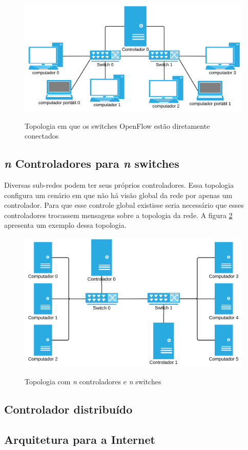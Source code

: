 \begin{figure}[h!]
    \centering
    \includegraphics[scale=0.8]{img/controller-n-linked-switches}
    \label{fig:controller-n-linked-switches}
    \caption{Topologia em que os switches OpenFlow 
    estão diretamente conectados}
\end{figure}


\subsection{\emph{n} Controladores para \emph{n} switches}

Diversas sub-redes podem ter seus próprios controladores.
Essa topologia configura um cenário em que não há visão global da rede 
por apenas um controlador. 
Para que esse controle global existisse seria necessário que esses 
controladores trocassem mensagens sobre a topologia da rede.
A figura \ref{fig:n-controllers-n-switches} apresenta um exemplo dessa 
topologia.

\begin{figure}[h!]
    \centering
    \includegraphics[scale=0.9]{img/n-controllers-n-switches}
    \label{fig:n-controllers-n-switches}
    \caption{Topologia com \emph{n} controladores e \emph{n} switches}
\end{figure}


\subsection{Controlador distribuído}

\subsection{Arquitetura para a Internet}
